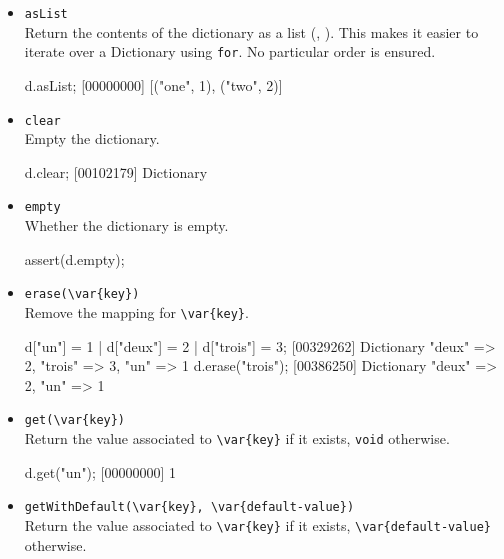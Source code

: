 \begin{itemize}
\item \lstinline|asList|\\
  Return the contents of the dictionary as a  list
  (, ).  This makes it easier to iterate over a
  Dictionary using \lstinline|for|.  No particular order is ensured.

\begin{urbiscript}[firstnumber=last]
d.asList;
[00000000] [("one", 1), ("two", 2)]
\end{urbiscript}

\item \lstinline|clear|\\
  Empty the dictionary.

\begin{urbiscript}[firstnumber=last]
d.clear;
[00102179] Dictionary {}
\end{urbiscript}

\item \lstinline|empty|\\
  Whether the dictionary is empty.

\begin{urbiscript}[firstnumber=last]
assert(d.empty);
\end{urbiscript}

\item \lstinline|erase(\var{key})|\\
  Remove the mapping for \lstinline|\var{key}|.

\begin{urbiscript}[firstnumber=last]
d["un"] = 1 | d["deux"] = 2 | d["trois"] = 3;
[00329262] Dictionary {"deux" => 2, "trois" => 3, "un" => 1}
d.erase("trois");
[00386250] Dictionary {"deux" => 2, "un" => 1}
\end{urbiscript}

\item \lstinline|get(\var{key})|\\
  Return the value associated to  \lstinline|\var{key}| if it exists,
  \lstinline|void| otherwise.

\begin{urbiscript}[firstnumber=last]
d.get("un");
[00000000] 1
\end{urbiscript}


\item \lstinline|getWithDefault(\var{key}, \var{default-value})|\\
  Return the value associated to  \lstinline|\var{key}| if it exists,
  \lstinline|\var{default-value}| otherwise.


\end{itemize}
